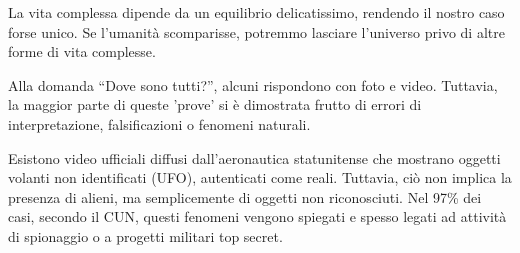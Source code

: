 \documentclass[12pt]{book} %
\begin{document}
\begin{mdframed}[linewidth=1pt]
La vita complessa dipende da un equilibrio delicatissimo, rendendo il nostro caso forse unico. Se l’umanità scomparisse, potremmo lasciare l’universo privo di altre forme di vita complesse.

Alla domanda “Dove sono tutti?”, alcuni rispondono con foto e video. Tuttavia, la maggior parte di queste 'prove' si è dimostrata frutto di errori di interpretazione, falsificazioni o fenomeni naturali. 

Esistono video ufficiali diffusi dall’aeronautica statunitense che mostrano oggetti volanti non identificati (UFO), autenticati come reali. Tuttavia, ciò non implica la presenza di alieni, ma semplicemente di oggetti non riconosciuti. Nel 97\% dei casi, secondo il CUN, questi fenomeni vengono spiegati e spesso legati ad attività di spionaggio o a progetti militari top secret.
\end{mdframed}
\end{document}
